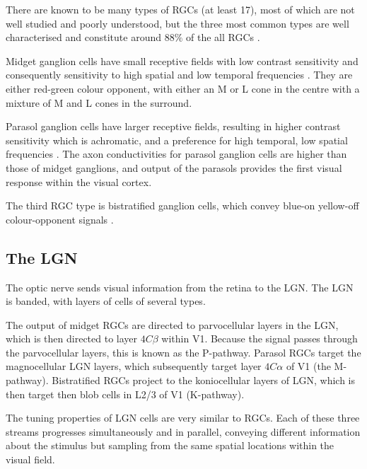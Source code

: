 There are known to be many types of \acp{RGC} (at least \num{17}), most of which are not well studied and poorly understood, but the three most common types are well characterised and constitute around $88\%$ of the all \acp{RGC} \citep{Nassi2009}.

Midget ganglion cells have small receptive fields with low contrast sensitivity and consequently sensitivity to high spatial and low temporal frequencies \citep{Nassi2009}.
They are either red-green colour opponent, with either an \ac{M} or \ac{L} cone in the centre with a mixture of \ac{M} and \ac{L} cones in the surround.

Parasol ganglion cells have larger receptive fields, resulting in higher contrast sensitivity which is achromatic, and a preference for high temporal, low spatial frequencies \citep{Nassi2009}.
The axon conductivities for parasol ganglion cells are higher than those of midget ganglions, and output of the parasols provides the first visual response within the visual cortex.

The third \ac{RGC} type is bistratified ganglion cells, which convey blue-on yellow-off colour-opponent signals \citep{Nassi2009}.



\subsection{The \acl{LGN}}

The optic nerve sends visual information from the retina to the \ac{LGN}.
The \ac{LGN} is banded, with layers of cells of several types.

The output of midget \acp{RGC} are directed to parvocellular layers in the \ac{LGN}, which is then directed to layer $4C\beta$ within \ac{V1}.
Because the signal passes through the parvocellular layers, this is known as the P-pathway.
Parasol \acp{RGC} target the magnocellular \ac{LGN} layers, which subsequently target layer $4C\alpha$ of \ac{V1} (the M-pathway).
Bistratified \acp{RGC} project to the koniocellular layers of \ac{LGN}, which is then target then blob cells in \ac{L2/3} of \ac{V1} (K-pathway).

The tuning properties of \ac{LGN} cells are very similar to \acp{RGC}.
Each of these three streams progresses simultaneously and in parallel, conveying different information about the stimulus but sampling from the same spatial locations within the visual field.


